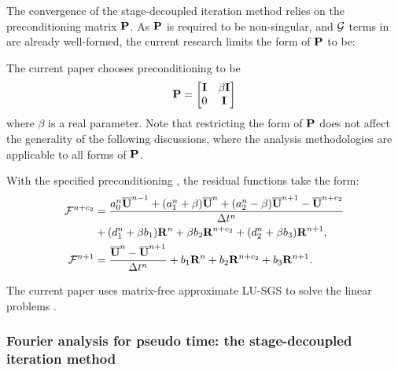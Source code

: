 The convergence of the stage-decoupled iteration method relies on
the preconditioning matrix $\mathbf{P}$.
As $\mathbf{P}$ is required to be non-singular, and
$\mathcal{G}$ terms in  are already
well-formed, the current research limits the form
of $\mathbf{P}$ to be:

The current paper chooses preconditioning to be 
\begin{equation}
    \mathbf{P} = \begin{bmatrix}
        \mathbf{I} & \beta\mathbf{I} \\
        0    & \mathbf{I}
    \end{bmatrix}
    \label{eq:specialP}
\end{equation} 
where $\beta$ is a real parameter.
Note that restricting the form of $\mathbf{P}$ does not affect the
generality of the following discussions,
where the analysis methodologies
are applicable to all forms of $\mathbf{P}$.

With the specified preconditioning ,
the residual functions take the form:
\begin{equation}
    \begin{aligned}
        \mathcal{F}^{n+c_2} & =
        \frac{a^n_0\overline{\mathbf{U}}^{n - 1} +
            (a^n_1+\beta)\overline{\mathbf{U}}^{n} +
            (a^n_2-\beta)\overline{\mathbf{U}}^{n + 1} - \overline{\mathbf{U}}^{n+c_2}}{{\Delta} t^n}
        \\ & +
        (d^n_1 + \beta b_1)\mathbf{R}^{n} +
        \beta b_2 \mathbf{R}^{n+c_2} +
        (d^n_2 + \beta b_3)\mathbf{R}^{n + 1},                             \\
        \mathcal{F}^{n+1}   & =    \frac{\overline{\mathbf{U}}^{n} - \overline{\mathbf{U}}^{n+1}}{{\Delta} t^n}  +
        b_1 \mathbf{R}^n +
        b_2 \mathbf{R}^{n+c_2} +
        b_3 \mathbf{R}^{n+1}.
    \end{aligned}
\end{equation}

The current paper uses matrix-free approximate LU-SGS
\cite{luo1998fast,luo2001accurate} to solve the linear problems .

\subsubsection{Fourier analysis for pseudo time: the stage-decoupled iteration method}
\label{sssec:SDSFourier}

